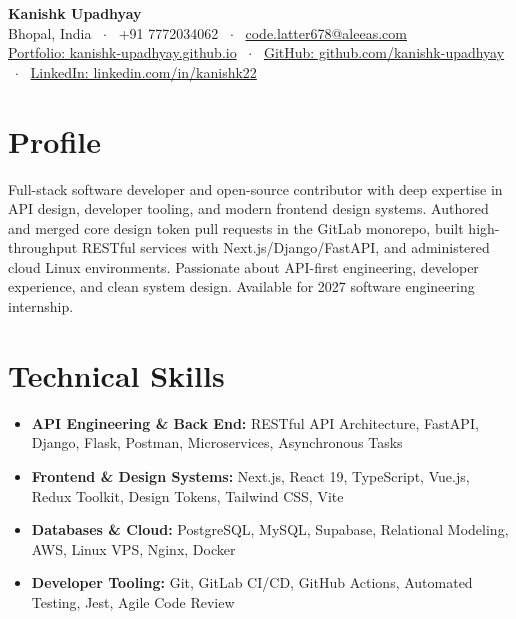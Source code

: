 \documentclass[10pt,a4paper]{article}
\begin{document}
\begin{center}
    {\huge \textbf{Kanishk Upadhyay}} \\ \vspace{2pt}
    Bhopal, India \ $\cdot$ \ +91 7772034062 \ $\cdot$ \ \href{mailto:code.latter678@aleeas.com}{code.latter678@aleeas.com} \\ \vspace{2pt}
    \href{https://kanishk-upadhyay.github.io/}{Portfolio: kanishk-upadhyay.github.io} \ $\cdot$ \ 
    \href{https://github.com/kanishk-upadhyay}{GitHub: github.com/kanishk-upadhyay} \ $\cdot$ \ 
    \href{https://linkedin.com/in/kanishk22}{LinkedIn: linkedin.com/in/kanishk22}
\end{center}

\vspace{-6pt}
\section{Profile}
Full-stack software developer and open-source contributor with deep expertise in API design, developer tooling, and modern frontend design systems. Authored and merged core design token pull requests in the GitLab monorepo, built high-throughput RESTful services with Next.js/Django/FastAPI, and administered cloud Linux environments. Passionate about API-first engineering, developer experience, and clean system design. Available for 2027 software engineering internship.

\section{Technical Skills}
\begin{itemize}
    \item \textbf{API Engineering \& Back End:} RESTful API Architecture, FastAPI, Django, Flask, Postman, Microservices, Asynchronous Tasks
    \item \textbf{Frontend \& Design Systems:} Next.js, React 19, TypeScript, Vue.js, Redux Toolkit, Design Tokens, Tailwind CSS, Vite
    \item \textbf{Databases \& Cloud:} PostgreSQL, MySQL, Supabase, Relational Modeling, AWS, Linux VPS, Nginx, Docker
    \item \textbf{Developer Tooling:} Git, GitLab CI/CD, GitHub Actions, Automated Testing, Jest, Agile Code Review
\end{itemize}
\end{document}
